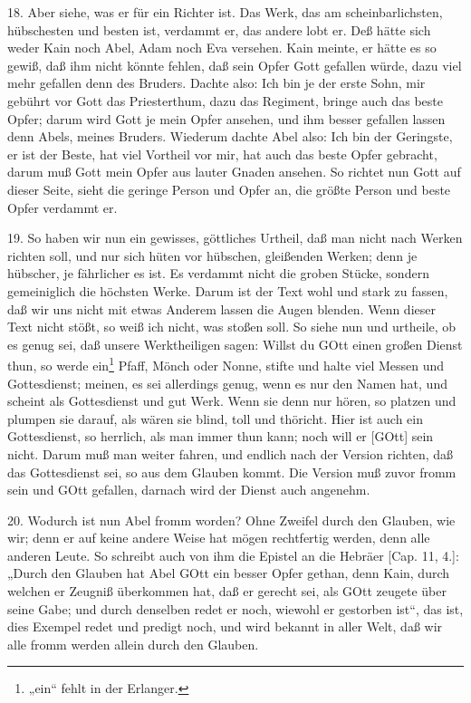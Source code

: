 18. Aber siehe, was er für ein Richter ist. Das Werk, das am scheinbarlichsten, hübschesten und besten ist, verdammt er, das andere lobt er. Deß hätte sich weder Kain noch Abel, Adam noch Eva versehen. Kain meinte, er hätte es so gewiß, daß ihm nicht könnte fehlen, daß sein Opfer Gott gefallen würde, dazu viel mehr gefallen denn des Bruders. Dachte also: Ich bin je der erste Sohn, mir gebührt vor Gott das Priesterthum, dazu das Regiment, bringe auch das beste Opfer; darum wird Gott je mein Opfer ansehen, und ihm besser gefallen lassen denn Abels, meines Bruders. Wiederum dachte Abel also: Ich bin der Geringste, er ist der Beste, hat viel Vortheil vor mir, hat auch das beste Opfer gebracht, darum muß Gott mein Opfer aus lauter Gnaden ansehen. So richtet nun Gott auf dieser Seite, sieht die geringe Person und Opfer an, die größte Person und beste Opfer verdammt er.

19. So haben wir nun ein gewisses, göttliches Urtheil, daß man nicht nach Werken richten soll, und nur sich hüten vor hübschen, gleißenden Werken; denn je hübscher, je fährlicher es ist. Es verdammt nicht die groben Stücke, sondern gemeiniglich die höchsten Werke. Darum ist der Text wohl und stark zu fassen, daß wir uns nicht mit etwas Anderem lassen die Augen blenden. Wenn dieser Text nicht stößt, so weiß ich nicht,
was stoßen soll. So siehe nun und urtheile, ob es genug sei, daß unsere Werktheiligen sagen: Willst du GOtt einen großen Dienst thun, so werde ein\footnote{„ein“ fehlt in der Erlanger.} Pfaff, Mönch oder Nonne, stifte und halte viel Messen und Gottesdienst; meinen, es sei allerdings genug, wenn es nur den Namen hat, und scheint als Gottesdienst und gut Werk. Wenn sie denn nur hören, so platzen und plumpen sie darauf, als wären sie blind, toll und thöricht. Hier ist auch ein Gottesdienst, so herrlich, als man immer thun kann; noch will er [GOtt] sein nicht. Darum muß man weiter fahren, und endlich nach der Version richten, daß das Gottesdienst sei, so aus dem Glauben kommt. Die Version muß zuvor fromm sein und GOtt gefallen, darnach wird der Dienst auch angenehm.

20. Wodurch ist nun Abel fromm worden? Ohne Zweifel durch den Glauben, wie wir; denn er auf keine andere Weise hat mögen rechtfertig werden, denn alle anderen Leute. So schreibt auch von ihm die Epistel an die Hebräer [Cap. 11, 4.]: „Durch den Glauben hat Abel GOtt ein besser Opfer gethan, denn Kain, durch welchen er Zeugniß überkommen hat, daß er gerecht sei, als GOtt zeugete über seine Gabe; und durch denselben redet er noch, wiewohl er gestorben ist“, das ist, dies Exempel redet und predigt noch, und wird bekannt in aller Welt, daß wir alle fromm werden allein durch den Glauben.


